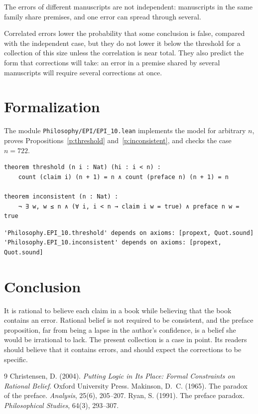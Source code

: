 \documentclass{situationist-preprint}
\begin{document}
\begin{objection}
The errors of different manuscripts are not independent: manuscripts in the same family share premises, and one error can spread through several.
\end{objection}

\begin{reply}
Correlated errors lower the probability that some conclusion is false, compared with the independent case, but they do not lower it below the threshold for a collection of this size unless the correlation is near total. They also predict the form that corrections will take: an error in a premise shared by several manuscripts will require several corrections at once.
\end{reply}

\section{Formalization}

The module \nolinkurl{Philosophy/EPI/EPI_10.lean} implements the model for arbitrary $n$, proves Propositions~\ref{p:threshold} and~\ref{p:inconsistent}, and checks the case $n = 722$.

\begin{lstlisting}
theorem threshold (n i : Nat) (hi : i < n) :
    count (claim i) (n + 1) = n ∧ count (preface n) (n + 1) = n

theorem inconsistent (n : Nat) :
    ¬ ∃ w, w ≤ n ∧ (∀ i, i < n → claim i w = true) ∧ preface n w = true
\end{lstlisting}

\begin{lstlisting}
'Philosophy.EPI_10.threshold' depends on axioms: [propext, Quot.sound]
'Philosophy.EPI_10.inconsistent' depends on axioms: [propext, Quot.sound]
\end{lstlisting}

\section{Conclusion}

It is rational to believe each claim in a book while believing that the book contains an error. Rational belief is not required to be consistent, and the preface proposition, far from being a lapse in the author's confidence, is a belief she would be irrational to lack. The present collection is a case in point. Its readers should believe that it contains errors, and should expect the corrections to be specific.

\begin{thebibliography}{9}\small
{} Christensen, D. (2004). \emph{Putting Logic in Its Place: Formal Constraints on Rational Belief}. Oxford University Press.
 Makinson, D.~C. (1965). The paradox of the preface. \emph{Analysis}, 25(6), 205--207.
 Ryan, S. (1991). The preface paradox. \emph{Philosophical Studies}, 64(3), 293--307.
\end{thebibliography}
\end{document}
